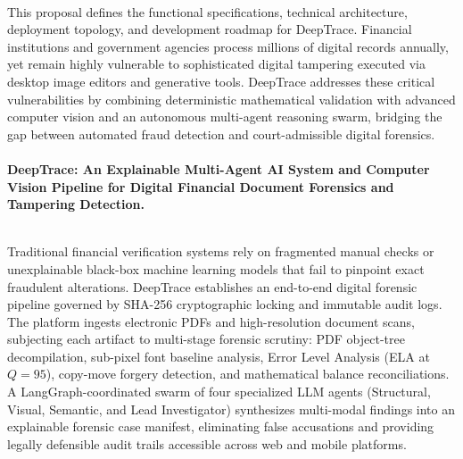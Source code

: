 \documentclass[12pt,a4paper]{article}
\begin{document}
\\[8pt]
This proposal defines the functional specifications, technical architecture, deployment topology, and development roadmap for DeepTrace. Financial institutions and government agencies process millions of digital records annually, yet remain highly vulnerable to sophisticated digital tampering executed via desktop image editors and generative tools. DeepTrace addresses these critical vulnerabilities by combining deterministic mathematical validation with advanced computer vision and an autonomous multi-agent reasoning swarm, bridging the gap between automated fraud detection and court-admissible digital forensics.\\[14pt]

\\[8pt]
\textbf{DeepTrace: An Explainable Multi-Agent AI System and Computer Vision Pipeline for Digital Financial Document Forensics and Tampering Detection.}

\newpage
{}\\[8pt]
Traditional financial verification systems rely on fragmented manual checks or unexplainable black-box machine learning models that fail to pinpoint exact fraudulent alterations. DeepTrace establishes an end-to-end digital forensic pipeline governed by SHA-256 cryptographic locking and immutable audit logs. The platform ingests electronic PDFs and high-resolution document scans, subjecting each artifact to multi-stage forensic scrutiny: PDF object-tree decompilation, sub-pixel font baseline analysis, Error Level Analysis (ELA at $Q=95$), copy-move forgery detection, and mathematical balance reconciliations. A LangGraph-coordinated swarm of four specialized LLM agents (Structural, Visual, Semantic, and Lead Investigator) synthesizes multi-modal findings into an explainable forensic case manifest, eliminating false accusations and providing legally defensible audit trails accessible across web and mobile platforms.\\[14pt]
\end{document}
